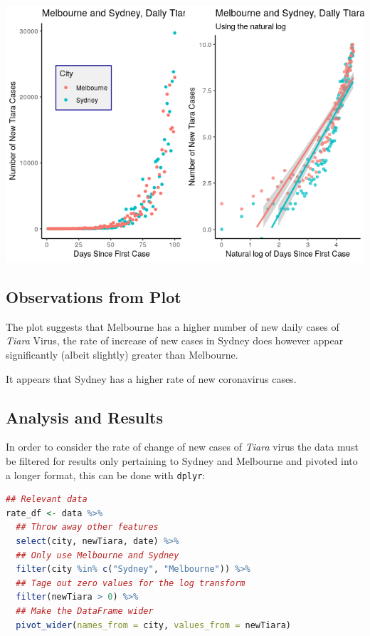 \documentclass{article}
\newcommand{\passthrough}[1]{#1}
\begin{document}
\includegraphics{main_files/figure-html/unnamed-chunk-19-1.png}

\hypertarget{observations-from-plot-4}{%
\subsection{Observations from Plot}\label{observations-from-plot-4}}

The plot suggests that Melbourne has a higher number of new daily cases
of \emph{Tiara} Virus, the rate of increase of new cases in Sydney does
however appear significantly (albeit slightly) greater than Melbourne.

It appears that Sydney has a higher rate of new coronavirus cases.

\hypertarget{analysis-and-results-4}{%
\subsection{Analysis and Results}\label{analysis-and-results-4}}

In order to consider the rate of change of new cases of \emph{Tiara}
virus the data must be filtered for results only pertaining to Sydney
and Melbourne and pivoted into a longer format, this can be done with
\passthrough{\lstinline!dplyr!}:

\begin{lstlisting}[language=R]
## Relevant data
rate_df <- data %>% 
  ## Throw away other features
  select(city, newTiara, date) %>% 
  ## Only use Melbourne and Sydney
  filter(city %in% c("Sydney", "Melbourne")) %>% 
  ## Tage out zero values for the log transform
  filter(newTiara > 0) %>% 
  ## Make the DataFrame wider
  pivot_wider(names_from = city, values_from = newTiara)
\end{lstlisting}
\end{document}
